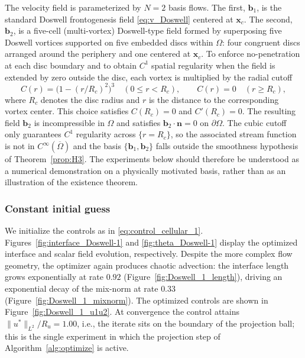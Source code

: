\documentclass[12pt, reqno]{amsart}
\theoremstyle{plain}
\theoremstyle{definition}
\numberwithin{equation}{section}
\numberwithin{figure}{section}
\numberwithin{algorithm}{section}
\begin{document}
The velocity field is parameterized by $N=2$ basis flows. The first, $\mathbf{b}_1$, is the standard Doswell frontogenesis field \eqref{eq:v_Doswell} centered at $\mathbf{x}_c$. The second, $\mathbf{b}_2$, is a five-cell (multi-vortex) Doswell-type field formed by superposing five Doswell vortices supported on five embedded discs within $\Omega$: four congruent discs arranged around the periphery and one centered at $\mathbf{x}_c$. To enforce no-penetration at each disc boundary and to obtain $C^1$ spatial regularity when the field is extended by zero outside the disc, each vortex is multiplied by the radial cutoff
\[
C(r)=\bigl(1-(r/R_c)^2\bigr)^3 \quad (0\le r<R_c),
\qquad C(r)=0 \quad (r\ge R_c),
\]
where $R_c$ denotes the disc radius and $r$ is the distance to the corresponding vortex center. This choice satisfies $C(R_c)=0$ and $C'(R_c)=0$. The resulting field $\mathbf{b}_2$ is incompressible in $\Omega$ and satisfies $\mathbf{b}_2\cdot\mathbf{n}=0$ on $\partial\Omega$. The cubic cutoff only guarantees $C^1$ regularity across $\{r=R_c\}$, so the associated stream function is not in $C^\infty(\overline\Omega)$ and the basis $\{\mathbf{b}_1,\mathbf{b}_2\}$ falls outside the smoothness hypothesis of Theorem~\ref{prop:H3}. The experiments below should therefore be understood as a numerical demonstration on a physically motivated basis, rather than as an illustration of the existence theorem.

\subsubsection{Constant initial guess}
We initialize the controls as in \eqref{eq:control_cellular_1}. Figures~\ref{fig:interface_Doswell-1} and \ref{fig:theta_Doswell-1} display the optimized interface and scalar field evolution, respectively. Despite the more complex flow geometry, the optimizer again produces chaotic advection: the interface length grows exponentially at rate $0.92$ (Figure~\ref{fig:Doswell_1_length}), driving an exponential decay of the mix-norm at rate $0.33$ (Figure~\ref{fig:Doswell_1_mixnorm}). The optimized controls are shown in Figure~\ref{fig:Doswell_1_u1u2}. At convergence the control attains $\|u^*\|_{L^2}/R_u = 1.00$, i.e., the iterate sits on the boundary of the projection ball; this is the single experiment in which the projection step of Algorithm~\ref{alg:optimize} is active.
\end{document}
